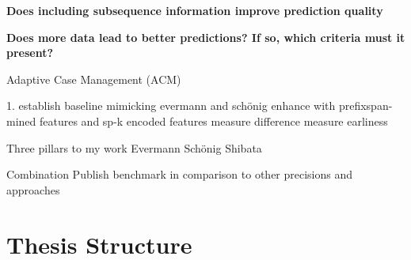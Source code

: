 
\textbf{Does including subsequence information improve prediction quality}

\textbf{Does more data lead to better predictions? If so, which criteria must it present?}

Adaptive Case Management (ACM)

1. establish baseline mimicking evermann and schönig
enhance with prefixspan-mined features and sp-k encoded features
measure difference
measure earliness

Three pillars to my work
Evermann
Schönig
Shibata

Combination
Publish benchmark in comparison to other precisions and approaches

\section{Thesis Structure}\label{sec:intro:structure}


